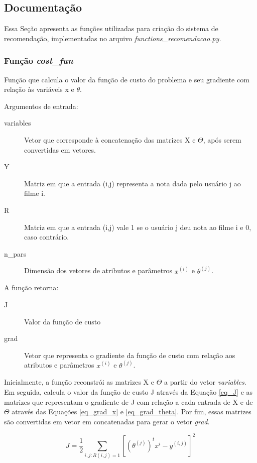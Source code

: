 \documentclass[12pt]{article}
\begin{document}
\subsection{Documentação} \label{doc_rec}
Essa Seção apresenta as funções utilizadas para criação do sistema de recomendação, implementadas no arquivo \textit{functions\_recomendacao.py.}

\subsubsection{Função \textit{cost\_fun}}
Função que calcula o valor da função de custo do problema e seu gradiente com relação às variáveis x e $\theta$.

Argumentos de entrada:

\begin{description}
\item[variables] Vetor que corresponde à concatenação das matrizes X e $\Theta$, após serem convertidas em vetores.
\item[Y] Matriz em que a entrada (i,j) representa a nota dada pelo usuário j ao filme i.
\item[R] Matriz em que a entrada (i,j) vale 1 se o usuário j deu nota ao filme i e 0, caso contrário.
\item[n\_pars] Dimensão dos vetores de atributos e parâmetros $x^{(i)}$ e $\theta^{(j)}$.
\end{description}

A função retorna:

\begin{description}
\item[J] Valor da função de custo
\item[grad] Vetor que representa o gradiente da função de custo com relação aos atributos e parâmetros $x^{(i)}$ e $\theta^{(j)}$.
\end{description}

Inicialmente, a função reconstrói as matrizes X e $\Theta$ a partir do vetor \textit{variables}. Em seguida, calcula o valor da função de custo J através da Equação \ref{eq_J} e as matrizes  que representam o gradiente de J com relação a cada entrada de X e de $\Theta$ através das Equações \ref{eq_grad_x} e \ref{eq_grad_theta}. Por fim, essas matrizes são convertidas em vetor em concatenadas para gerar o vetor \textit{grad}. 

\begin{equation} \label{eq_J}
J = \frac{1}{2} \sum_{i,j: R(i,j) = 1} \left[\left(\theta^{(j)}\right)^t x^i - y^{(i,j)}\right]^2 
\end{equation}
\end{document}

